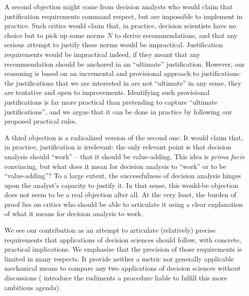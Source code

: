 \documentclass[preprint, french, english, 11pt, authoryear]{elsarticle}%
\begin{document}
A second objection might come from decision analysts who would claim that justification requirements command respect, but are impossible to implement in practice. Such critics would claim that, in practice, decision scientists have no choice but to pick up some norms $N$ to derive recommendations, and that any serious attempt to justify these norms would be impractical. Justification requirements would be impractical indeed, if they meant that any recommendation should be anchored in an “ultimate” justification. However, our reasoning is based on an incremental and provisional approach to justifications: the justifications that we are interested in are not ``ultimate'' in any sense, they are tentative and open to improvements. Identifying such provisional justifications is far more practical than pretending to capture ``ultimate justifications'', and we argue that it can be done in practice by following our proposed practical rules.

A third objection is a radicalized version of the second one. It would claim that, in practice, justification is irrelevant: the only relevant point is that decision analysis should ``work'' -- that it should be value-adding. This idea is \emph{prima facie} convincing, but what does it mean for decision analysis to ``work'' or to be ``value-adding''? 
To a large extent, the successfulness of decision analysis hinges upon the analyst's capacity to justify it. In that sense, this would-be objection does not seem to be a real objection after all. At the very least, the burden of proof lies on critics who should be able to articulate it using a clear explanation of what it means for decision analysis to work. 

We see our contribution as an attempt to articulate (relatively) precise requirements that applications of decision sciences should follow, with concrete, practical implications. We emphasize that the precision of those requirements is limited in many respects.
It provide neither a metric nor generally applicable mechanical means to compare any two applications of decision sciences without discussions (\citet{cailloux_formal_2018} introduce the rudiments a procedure liable to fulfill this more ambitious agenda).
\end{document}
